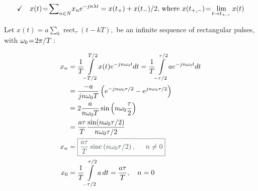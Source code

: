 \documentclass[17pt,a4paper]{extarticle}
\newcommand{\igual}{\negthinspace=\negthinspace}
\newcommand{\cita}[1]{\textcolor[rgb]{0.23, 0.27, 0.29}{\boxed{{\Large #1}}}}
\begin{document}
\begin{displaymath}
		\checkmark\quad	{x(t)\igual {{\displaystyle\sum\nolimits_{n\in N}}
	x_{n}e^{-jn\lambda t}}= x(t_{+})+x(t_{-})/2},\, \textrm{where }x(t_{+,-})\igual \lim_{t\rightarrow t_{+,-}}x(t)
\end{displaymath}
 
\clearpage
\begin{example} Let $
x(t){=}a{\sum\nolimits_{k}} \operatorname{rect}_{\tau}(t{-}kT),
$ be an infinite sequence of rectangular pulses, with $\omega_{0}\igual{2\pi}/{T}:$
\begin{linenomath*}
	\begin{align*}
		x_{n} & =\dfrac{1}{T}{\displaystyle\int\limits_{-T/2}^{T/2}}
		x(t)e^{-jn\omega_{0}t}dt=\dfrac{1}{T}{\displaystyle\int\limits_{-\tau/2}^{\tau/2}}
		ae^{-jn\omega_{0}t}dt \\
		 & =\dfrac{-a}{jn\omega_{0}T}\left( e^{-jn\omega_{0}\tau /2}-e^{jn\omega_{0}\tau/2}\right)\\
		 &=2\dfrac{a}{n\omega_{0}T}\sin\left(
		n\omega_{0}\dfrac{\tau}{2}\right) \\
		& =\dfrac{a\tau}{T}\dfrac{\sin(n\omega_{0}\tau/2)}{n\omega_{0}\tau
			/2}\\
		x_{n} &=\cita{\dfrac{a\tau}{T}\operatorname{sinc}\left(n\omega_{0}\tau/2\right),\quad n\neq
		0\label{xn_pulrec}}\\ 
		x_{0} & =\dfrac{1}{T}{\displaystyle\int\limits_{-\tau/2}^{\tau/2}}
		a\,dt=\dfrac{a\tau}{T} ,\quad n= 0
	\end{align*}
\end{linenomath*}
\end{example}
\clearpage
\end{document}
